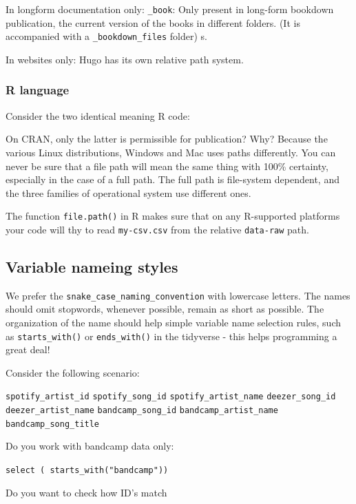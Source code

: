 \documentclass[
  fontsize=13pt,
  english,
  a4paper,
  openany, a4paper, oneside]{book}
\begin{document}
In longform documentation only:
\texttt{\_book}: Only present in long-form bookdown publication, the current version of the books in different folders. (It is accompanied with a \texttt{\_bookdown\_files} folder)
s.

In websites only:
Hugo has its own relative path system.

\hypertarget{R-guide}{%
\subsubsection{R language}\label{R-guide}}

Consider the two identical meaning R code:

On CRAN, only the latter is permissible for publication? Why? Because the various Linux distributions, Windows and Mac uses paths differently. You can never be sure that a file path will mean the same thing with 100\% certainty, especially in the case of a full path. The full path is file-system dependent, and the three families of operational system use different ones.

The function \texttt{file.path()} in R makes sure that on any R-supported platforms your code will thy to read \texttt{my-csv.csv} from the relative \texttt{data-raw} path.

\hypertarget{variable-nameing-styles}{%
\subsection{Variable nameing styles}\label{variable-nameing-styles}}

We prefer the \texttt{snake\_case\_naming\_convention} with lowercase letters. The names should omit stopwords, whenever possible, remain as short as possible. The organization of the name should help simple variable name selection rules, such as \texttt{starts\_with()} or \texttt{ends\_with()} in the tidyverse - this helps programming a great deal!

Consider the following scenario:

\texttt{spotify\_artist\_id}
\texttt{spotify\_song\_id}
\texttt{spotify\_artist\_name}
\texttt{deezer\_song\_id}
\texttt{deezer\_artist\_name}
\texttt{bandcamp\_song\_id}
\texttt{bandcamp\_artist\_name}
\texttt{bandcamp\_song\_title}

Do you work with bandcamp data only:

\texttt{select\ (\ starts\_with("bandcamp"))}

Do you want to check how ID's match
\end{document}

